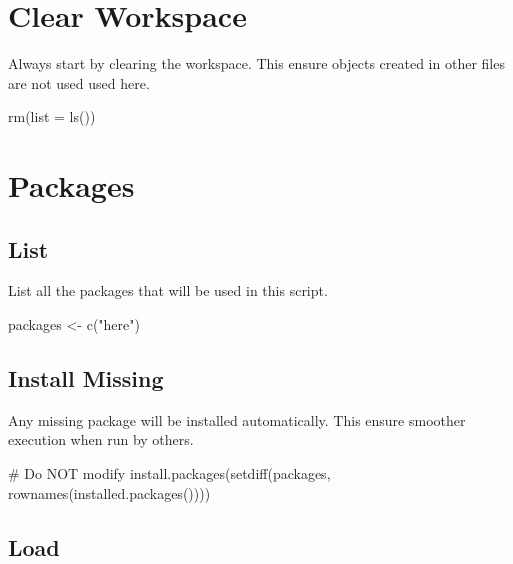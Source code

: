 \documentclass[
  letterpaper,
  DIV=11,
  numbers=noendperiod]{scrreprt}
\newenvironment{Shaded}{\begin{snugshade}}{\end{snugshade}}
\newcommand{\AttributeTok}[1]{\textcolor[rgb]{0.40,0.45,0.13}{#1}}
\newcommand{\CommentTok}[1]{\textcolor[rgb]{0.37,0.37,0.37}{#1}}
\newcommand{\FunctionTok}[1]{\textcolor[rgb]{0.28,0.35,0.67}{#1}}
\newcommand{\NormalTok}[1]{\textcolor[rgb]{0.00,0.23,0.31}{#1}}
\newcommand{\OtherTok}[1]{\textcolor[rgb]{0.00,0.23,0.31}{#1}}
\newcommand{\StringTok}[1]{\textcolor[rgb]{0.13,0.47,0.30}{#1}}
\begin{document}
\section{Clear Workspace}\label{clear-workspace}

Always start by clearing the workspace. This ensure objects created in
other files are not used used here.

\begin{Shaded}
\begin{Highlighting}[]
\FunctionTok{rm}\NormalTok{(}\AttributeTok{list =} \FunctionTok{ls}\NormalTok{())}
\end{Highlighting}
\end{Shaded}

\section{Packages}\label{sec-packages}

\subsection{List}\label{list}

List all the packages that will be used in this script.

\begin{Shaded}
\begin{Highlighting}[]
\NormalTok{packages }\OtherTok{\textless{}{-}} \FunctionTok{c}\NormalTok{(}\StringTok{"here"}\NormalTok{)}
\end{Highlighting}
\end{Shaded}

\subsection{Install Missing}\label{install-missing}

Any missing package will be installed automatically. This ensure
smoother execution when run by others.

\begin{Shaded}
\begin{Highlighting}[]
\CommentTok{\# Do NOT modify}
\FunctionTok{install.packages}\NormalTok{(}\FunctionTok{setdiff}\NormalTok{(packages, }\FunctionTok{rownames}\NormalTok{(}\FunctionTok{installed.packages}\NormalTok{())))}
\end{Highlighting}
\end{Shaded}

\subsection{Load}\label{load}
\end{document}
